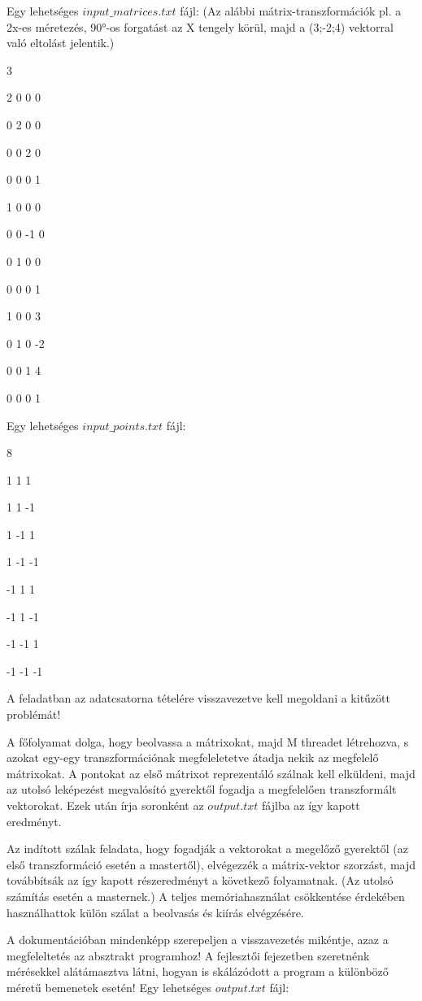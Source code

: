 \documentclass{article}
\begin{document}
Egy lehetséges $input\_matrices.txt$ fájl: (Az alábbi mátrix-transzformációk pl. a 2x-es méretezés, 90°-os forgatást az X tengely körül, majd a (3;-2;4) vektorral való eltolást jelentik.)

3

2 0 0 0

0 2 0 0

0 0 2 0

0 0 0 1

1 0 0 0

0 0 -1 0

0 1 0 0

0 0 0 1

1 0 0 3

0 1 0 -2

0 0 1 4

0 0 0 1

Egy lehetséges $input\_points.txt$ fájl:

8

1 1 1

1 1 -1

1 -1 1

1 -1 -1

-1 1 1

-1 1 -1

-1 -1 1

-1 -1 -1


A feladatban az adatcsatorna tételére visszavezetve kell megoldani a kitűzött problémát!

A főfolyamat dolga, hogy beolvassa a mátrixokat, majd M threadet létrehozva, s azokat egy-egy transzformációnak megfeleletetve átadja nekik az megfelelő mátrixokat. A pontokat az első mátrixot reprezentáló szálnak kell elküldeni, majd az utolsó leképezést megvalósító gyerektől fogadja a megfelelően transzformált vektorokat. Ezek után írja soronként az $output.txt$ fájlba az így kapott eredményt.

Az indított szálak feladata, hogy fogadják a vektorokat a megelőző gyerektől (az első transzformáció esetén a mastertől), elvégezzék a mátrix-vektor szorzást, majd továbbítsák az így kapott részeredményt a következő folyamatnak. (Az utolsó számítás esetén a masternek.) A teljes memóriahasználat csökkentése érdekében használhattok külön szálat a beolvasás és kiírás elvégzésére.

A dokumentációban mindenképp szerepeljen a visszavezetés mikéntje, azaz a megfeleltetés az absztrakt programhoz! A fejlesztői fejezetben szeretnénk mérésekkel alátámasztva látni, hogyan is skálázódott a program a különböző méretű bemenetek esetén! Egy lehetséges $output.txt$ fájl:
\end{document}
